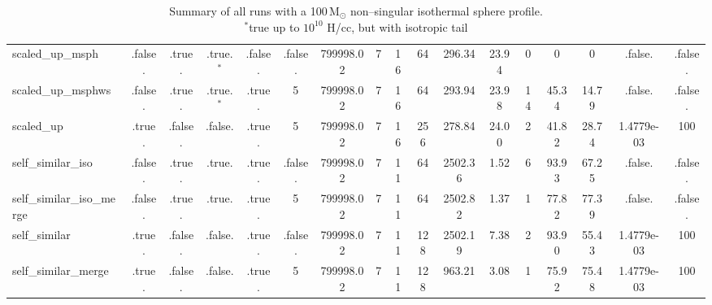 \begin{table}
\begin{adjustbox}{width=1.8\textheight}
\begin{tabular}{lcccccccccccccccc}
scaled\_up\_msph & .false. & .true. & .true.$^{\ast}$ & .false. & .false. & 799998.02 & 7 & 16 & 64 & 296.34 & 23.94 & 0 & 0 & 0 & .false. & .false. \\
scaled\_up\_msphws & .false. & .true. & .true.$^{\ast}$ & .true. & 5 & 799998.02 & 7 & 16 & 64 & 293.94 & 23.98 & 14 & 45.34 & 14.79 & .false. & .false. \\
scaled\_up & .true. & .false. & .false. & .true. & 5 & 799998.02 & 7 & 16 & 256 & 278.84 & 24.00 & 2 & 41.82 & 28.74 & 1.4779e-03 & 100 \\
self\_similar\_iso & .false. & .true. & .true. & .true. & .false. & 799998.02 & 7 & 11 & 64 & 2502.36 & 1.52 & 6 & 93.93 & 67.25 & .false. & .false. \\
self\_similar\_iso\_merge & .false. & .true. & .true. & .true. & 5 & 799998.02 & 7 & 11 & 64 & 2502.82 & 1.37 & 1 & 77.82 & 77.39 & .false. & .false. \\
self\_similar & .true. & .false. & .false. & .true. & .false. & 799998.02 & 7 & 11 & 128 & 2502.19 & 7.38 & 2 & 93.90 & 55.43 & 1.4779e-03 & 100 \\
self\_similar\_merge & .true. & .false. & .false. & .true. & 5 & 799998.02 & 7 & 11 & 128 & 963.21 & 3.08 & 1 & 75.92 & 75.48 & 1.4779e-03 & 100 \\
\bottomrule
\end{tabular}
\end{adjustbox}
\caption[Large--sphere runs]{Summary of all runs with a 100\,M$_{\odot}$ non--singular isothermal sphere profile.\\
				     $^{\ast}$true up to $10^{10}$ H/cc, but with isotropic tail}
\label{tab:all_const_rt_big}
\end{table}
